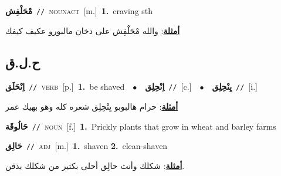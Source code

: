\documentclass[10pt,a4paper,twoside]{article} %
\begin{document}
\begin{multicols}{2}
{\setlength\topsep{0pt}\textbf{\foreignlanguage{arabic}{مْحَلْفِش}}\ {\color{gray}\texttt{//}\color{black}}\ \textsc{noun\textunderscore act}\ [m.]\ \textbf{1.}~craving sth\  \begin{flushright}\color{gray}\foreignlanguage{arabic}{\textbf{\underline{\foreignlanguage{arabic}{أمثلة}}}: والله مْحَلْفِش على دخان مالبورو عكيف كيفك}\end{flushright}\color{black}} \vspace{2mm}

\vspace{-3mm}
\subsection*{\color{blue}\foreignlanguage{arabic}{ح.ل.ق}\color{blue}{}} 

{\setlength\topsep{0pt}\textbf{\foreignlanguage{arabic}{اِنْحَلَق}}\ {\color{gray}\texttt{//}\color{black}}\ \textsc{verb}\ [p.]\ \textbf{1.}~be shaved\ \ $\bullet$\ \ \setlength\topsep{0pt}\textbf{\foreignlanguage{arabic}{اِنْحِلِق}}\ {\color{gray}\texttt{//}\color{black}}\ [c.]\ \ $\bullet$\ \ \setlength\topsep{0pt}\textbf{\foreignlanguage{arabic}{يِنْحِلِق}}\ {\color{gray}\texttt{//}\color{black}}\ [i.]\  \begin{flushright}\color{gray}\foreignlanguage{arabic}{\textbf{\underline{\foreignlanguage{arabic}{أمثلة}}}: حرام هالبوبو يِنْحِلِق شعره كله وهو بهيك عمر}\end{flushright}\color{black}} \vspace{2mm}

{\setlength\topsep{0pt}\textbf{\foreignlanguage{arabic}{حَالُوقَة}}\ {\color{gray}\texttt{//}\color{black}}\ \textsc{noun}\ [f.]\ \textbf{1.}~Prickly plants that grow in wheat and barley farms\ } \vspace{2mm}

{\setlength\topsep{0pt}\textbf{\foreignlanguage{arabic}{حَالِق}}\ {\color{gray}\texttt{//}\color{black}}\ \textsc{adj}\ [m.]\ \textbf{1.}~shaven  \textbf{2.}~clean-shaven\  \begin{flushright}\color{gray}\foreignlanguage{arabic}{\textbf{\underline{\foreignlanguage{arabic}{أمثلة}}}: شكلك وأنت حالِق أحلى بكثير من شكلك بذقن.}\end{flushright}\color{black}} \vspace{2mm}


\end{multicols}
\end{document}
